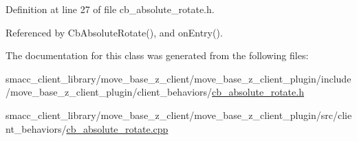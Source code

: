 Definition at line 27 of file cb\+\_\+absolute\+\_\+rotate.\+h.



Referenced by Cb\+Absolute\+Rotate(), and on\+Entry().



The documentation for this class was generated from the following files\+:\begin{DoxyCompactItemize}
\item 
smacc\+\_\+client\+\_\+library/move\+\_\+base\+\_\+z\+\_\+client/move\+\_\+base\+\_\+z\+\_\+client\+\_\+plugin/include/move\+\_\+base\+\_\+z\+\_\+client\+\_\+plugin/client\+\_\+behaviors/\hyperlink{cb__absolute__rotate_8h}{cb\+\_\+absolute\+\_\+rotate.\+h}\item 
smacc\+\_\+client\+\_\+library/move\+\_\+base\+\_\+z\+\_\+client/move\+\_\+base\+\_\+z\+\_\+client\+\_\+plugin/src/client\+\_\+behaviors/\hyperlink{cb__absolute__rotate_8cpp}{cb\+\_\+absolute\+\_\+rotate.\+cpp}\end{DoxyCompactItemize}
